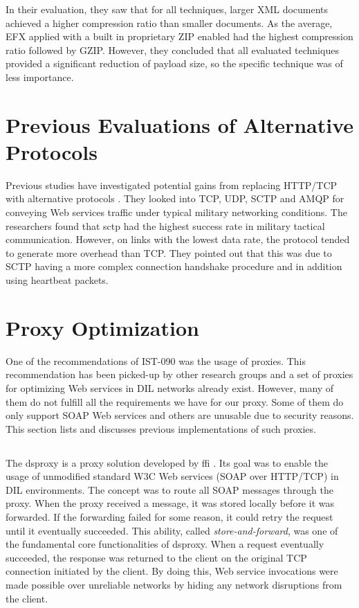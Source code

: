 In their evaluation, they saw that for all techniques, larger XML documents
achieved a higher compression ratio than smaller documents. As the average, EFX
applied with a built in proprietary ZIP enabled had the highest compression
ratio followed by GZIP. However, they concluded that all evaluated techniques
provided a significant reduction of payload size, so the specific technique was
of less importance.


\section{Previous Evaluations of Alternative Protocols}

Previous studies have investigated potential gains from replacing HTTP/TCP with
alternative protocols \cite{evaluation-transport-protocols-web-services}. They
looked into TCP, UDP, SCTP and AMQP for conveying Web services traffic under
typical military networking conditions. The researchers found that \gls{sctp}
had the highest success rate in military tactical communication. However, on
links with the lowest data rate, the protocol tended to generate more overhead
than TCP. They pointed out that this was due to SCTP having a more complex
connection handshake procedure and in addition using heartbeat packets.

\section{Proxy Optimization}

One of the recommendations of IST-090 was the usage of proxies. This
recommendation has been picked-up by other research groups and a set of proxies
for optimizing Web services in DIL networks already exist. However, many of them
do not fulfill all the requirements we have for our proxy. Some of them do
only support SOAP Web services and others are unusable due to security reasons.
This section lists and discusses previous implementations of such proxies.

\subsection{}

The \gls{dsproxy} is a proxy solution developed by \gls{ffi}
\cite{dsproxy-ffi}\cite{ieee-dsproxy}. Its goal was to enable the usage of
unmodified standard W3C Web services (SOAP over HTTP/TCP) in DIL environments.
The concept was to route all SOAP messages through the proxy. When the proxy
received a message, it was stored locally before it was forwarded. If the
forwarding failed for some reason, it could retry the request until it
eventually succeeded. This ability, called \textit{store-and-forward}, was one
of the fundamental core functionalities of \gls{dsproxy}. When a request
eventually succeeded, the response was returned to the client on the original
TCP connection initiated by the client. By doing this, Web service invocations
were made possible over unreliable networks by hiding any network disruptions
from the client.

